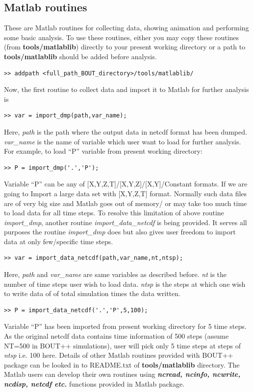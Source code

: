 \documentclass[12pt]{article}
\begin{document}
\subsection{Matlab routines}
\label{sec:matlabroutines}
These are Matlab routines for collecting data, showing animation and performing some basic analysis.
To use these routines, either you may copy these routines (from {\bf tools/matlablib}) directly to your present working directory
or a path to {\bf tools/matlablib} should be added before analysis.
%
\begin{verbatim}
>> addpath <full_path_BOUT_directory>/tools/matlablib/
\end{verbatim}
%
Now, the first routine to collect data and import it to Matlab for further analysis is
%
\begin{verbatim}
>> var = import_dmp(path,var_name);
\end{verbatim}
%
Here, {\it path} is the path where the output data in netcdf format has been dumped. {\it var\_name} is the name of variable
which user want to load for further analysis. For example, to load ``P'' variable from present working directory:
%
\begin{verbatim}
>> P = import_dmp('.','P');
\end{verbatim}
%
Variable ``P'' can be any of [X,Y,Z,T]/[X,Y,Z]/[X,Y]/Constant formats.
%
If we are going to Import a large data set with [X,Y,Z,T] format. Normally such data files are of very big size and
Matlab goes out of memory/ or may take too much time to load data for all time steps. To resolve this limitation of
above routine {\it import\_dmp}, another routine {\it import\_data\_netcdf} is being provided. It serves all purposes
the routine {\it import\_dmp} does but also gives user freedom to import data at only few/specific time steps.
%
\begin{verbatim}
>> var = import_data_netcdf(path,var_name,nt,ntsp);
\end{verbatim}
%
Here, {\it path} and {\it var\_name} are same variables as described before. {\it nt} is the number of time steps user wish to load data.
{\it ntsp} is the steps at which one wish to write data of of total simulation times the data written.
%
\begin{verbatim}
>> P = import_data_netcdf('.','P',5,100);
\end{verbatim}
%
Variable ``P'' has been imported from present working directory for 5 time steps. As the original netcdf data contains time information
of 500 steps (assume NT=500 in BOUT++ simulations), user will pick only 5 time steps at steps of {\it ntsp} i.e. 100 here.
%
Details of other Matlab routines provided with BOUT++ package can be looked in
to README.txt of {\bf tools/matlablib} directory.
The Matlab users can develop their own routines using {\bf \it ncread, ncinfo, ncwrite, ncdisp, netcdf etc.} functions provided in
Matlab package.
\end{document}
